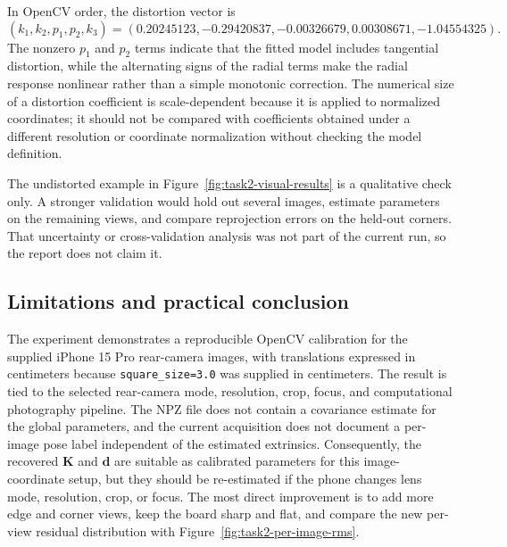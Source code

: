 In OpenCV order, the distortion vector is
\[
(k_1,k_2,p_1,p_2,k_3)
=(0.20245123,-0.29420837,-0.00326679,0.00308671,-1.04554325).
\]
The nonzero \(p_1\) and \(p_2\) terms indicate that the fitted model includes tangential distortion, while the alternating signs of the radial terms make the radial response nonlinear rather than a simple monotonic correction. The numerical size of a distortion coefficient is scale-dependent because it is applied to normalized coordinates; it should not be compared with coefficients obtained under a different resolution or coordinate normalization without checking the model definition.

The undistorted example in Figure~\ref{fig:task2-visual-results} is a qualitative check only. A stronger validation would hold out several images, estimate parameters on the remaining views, and compare reprojection errors on the held-out corners. That uncertainty or cross-validation analysis was not part of the current run, so the report does not claim it.

\subsection{Limitations and practical conclusion}

The experiment demonstrates a reproducible OpenCV calibration for the supplied iPhone 15 Pro rear-camera images, with translations expressed in centimeters because \texttt{square\_size=3.0} was supplied in centimeters. The result is tied to the selected rear-camera mode, resolution, crop, focus, and computational photography pipeline. The NPZ file does not contain a covariance estimate for the global parameters, and the current acquisition does not document a per-image pose label independent of the estimated extrinsics. Consequently, the recovered \(\mathbf K\) and \(\mathbf d\) are suitable as calibrated parameters for this image-coordinate setup, but they should be re-estimated if the phone changes lens mode, resolution, crop, or focus. The most direct improvement is to add more edge and corner views, keep the board sharp and flat, and compare the new per-view residual distribution with Figure~\ref{fig:task2-per-image-rms}.

